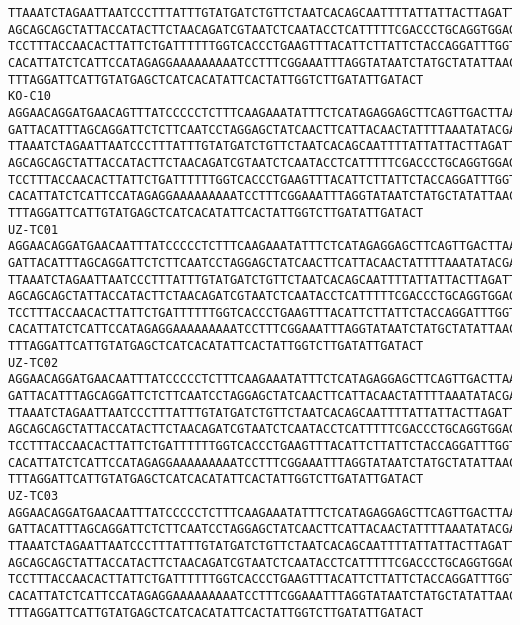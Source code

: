 \documentclass[11pt]{article}
\begin{document}
\begin{Verbatim}[commandchars=\\\{\}]
TTAAATCTAGAATTAATCCCTTTATTTGTATGATCTGTTCTAATCACAGCAATTTTATTATTACTTAGATTACCAGTCTT
AGCAGCAGCTATTACCATACTTCTAACAGATCGTAATCTCAATACCTCATTTTTCGACCCTGCAGGTGGAGGAGACCCAA
TCCTTTACCAACACTTATTCTGATTTTTTGGTCACCCTGAAGTTTACATTCTTATTCTACCAGGATTTGGTATTATTTCT
CACATTATCTCATTCCATAGAGGAAAAAAAAATCCTTTCGGAAATTTAGGTATAATCTATGCTATATTAACTATTGGAAT
TTTAGGATTCATTGTATGAGCTCATCACATATTCACTATTGGTCTTGATATTGATACT
KO-C10
AGGAACAGGATGAACAGTTTATCCCCCTCTTTCAAGAAATATTTCTCATAGAGGAGCTTCAGTTGACTTAAGAATCTTCA
GATTACATTTAGCAGGATTCTCTTCAATCCTAGGAGCTATCAACTTCATTACAACTATTTTAAATATACGACCAAAAAAC
TTAAATCTAGAATTAATCCCTTTATTTGTATGATCTGTTCTAATCACAGCAATTTTATTATTACTTAGATTACCAGTCTT
AGCAGCAGCTATTACCATACTTCTAACAGATCGTAATCTCAATACCTCATTTTTCGACCCTGCAGGTGGAGGAGACCCAA
TCCTTTACCAACACTTATTCTGATTTTTTGGTCACCCTGAAGTTTACATTCTTATTCTACCAGGATTTGGTATTATTTCT
CACATTATCTCATTCCATAGAGGAAAAAAAAATCCTTTCGGAAATTTAGGTATAATCTATGCTATATTAACTATTGGAAT
TTTAGGATTCATTGTATGAGCTCATCACATATTCACTATTGGTCTTGATATTGATACT
UZ-TC01
AGGAACAGGATGAACAATTTATCCCCCTCTTTCAAGAAATATTTCTCATAGAGGAGCTTCAGTTGACTTAAGAATCTTCA
GATTACATTTAGCAGGATTCTCTTCAATCCTAGGAGCTATCAACTTCATTACAACTATTTTAAATATACGACCAAAAAAC
TTAAATCTAGAATTAATCCCTTTATTTGTATGATCTGTTCTAATCACAGCAATTTTATTATTACTTAGATTACCAGTCTT
AGCAGCAGCTATTACCATACTTCTAACAGATCGTAATCTCAATACCTCATTTTTCGACCCTGCAGGTGGAGGAGACCCAA
TCCTTTACCAACACTTATTCTGATTTTTTGGTCACCCTGAAGTTTACATTCTTATTCTACCAGGATTTGGTATTATTTCT
CACATTATCTCATTCCATAGAGGAAAAAAAAATCCTTTCGGAAATTTAGGTATAATCTATGCTATATTAACTATTGGAAT
TTTAGGATTCATTGTATGAGCTCATCACATATTCACTATTGGTCTTGATATTGATACT
UZ-TC02
AGGAACAGGATGAACAATTTATCCCCCTCTTTCAAGAAATATTTCTCATAGAGGAGCTTCAGTTGACTTAAGAATCTTCA
GATTACATTTAGCAGGATTCTCTTCAATCCTAGGAGCTATCAACTTCATTACAACTATTTTAAATATACGACCAAAAAAC
TTAAATCTAGAATTAATCCCTTTATTTGTATGATCTGTTCTAATCACAGCAATTTTATTATTACTTAGATTACCAGTCTT
AGCAGCAGCTATTACCATACTTCTAACAGATCGTAATCTCAATACCTCATTTTTCGACCCTGCAGGTGGAGGAGACCCAA
TCCTTTACCAACACTTATTCTGATTTTTTGGTCACCCTGAAGTTTACATTCTTATTCTACCAGGATTTGGTATTATTTCT
CACATTATCTCATTCCATAGAGGAAAAAAAAATCCTTTCGGAAATTTAGGTATAATCTATGCTATATTAACTATTGGAAT
TTTAGGATTCATTGTATGAGCTCATCACATATTCACTATTGGTCTTGATATTGATACT
UZ-TC03
AGGAACAGGATGAACAATTTATCCCCCTCTTTCAAGAAATATTTCTCATAGAGGAGCTTCAGTTGACTTAAGAATCTTCA
GATTACATTTAGCAGGATTCTCTTCAATCCTAGGAGCTATCAACTTCATTACAACTATTTTAAATATACGACCAAAAAAC
TTAAATCTAGAATTAATCCCTTTATTTGTATGATCTGTTCTAATCACAGCAATTTTATTATTACTTAGATTACCAGTCTT
AGCAGCAGCTATTACCATACTTCTAACAGATCGTAATCTCAATACCTCATTTTTCGACCCTGCAGGTGGAGGAGACCCAA
TCCTTTACCAACACTTATTCTGATTTTTTGGTCACCCTGAAGTTTACATTCTTATTCTACCAGGATTTGGTATTATTTCT
CACATTATCTCATTCCATAGAGGAAAAAAAAATCCTTTCGGAAATTTAGGTATAATCTATGCTATATTAACTATTGGAAT
TTTAGGATTCATTGTATGAGCTCATCACATATTCACTATTGGTCTTGATATTGATACT
    \end{Verbatim}
\end{document}
